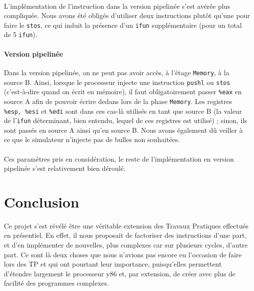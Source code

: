 \documentclass[12pt]{article}
\begin{document}
\paragraph{}L'implémentation de l'instruction dans la version pipelinée s'est avérée plus compliquée. Nous avons été obligés d'utiliser deux instructions plutôt qu'une pour faire le \verb+stos+, ce qui induit la présence d'un \verb+ifun+ supplémentaire (pour un total de 5 \verb+ifun+).

\paragraph{Version pipelinée}Dans la version pipelinée, on ne peut pas avoir accès, à l'étage \verb+Memory+, à la source B. Ainsi, lorsque le processeur injecte une instruction \verb+pushl+ ou \verb+stos+ (c'est-à-dire quand on écrit en mémoire), il faut obligatoirement passer \verb+%eax+ en source A afin de pouvoir écrire dedans lors de la phase \verb+Memory+. Les registres \verb+%esp, %esi+ et \verb+%edi+ sont dans ces cas-là utilisés en tant que source B (la valeur de l'\verb+ifun+ déterminant, bien entendu, lequel de ces registres est utilisé) ; sinon, ils sont passés en source A ainsi qu'en source B. Nous avons également dû veiller à ce que le simulateur n'injecte pas de bulles non souhaitées.

\paragraph{}Ces paramètres pris en considération, le reste de l'implémentation en version pipelinée s'est relativement bien déroulé.




\section*{Conclusion}
\paragraph{}Ce projet s'est révélé être une véritable extension des Travaux Pratiques effectués en présentiel. En effet, il nous proposait de factoriser des instructions d'une part, et d'en implémenter de nouvelles, plus complexes car sur plusieurs cycles, d'autre part. Ce sont là deux choses que nous n'avions pas encore eu l'occasion de faire lors des TP et qui ont pourtant leur importance, puisqu'elles permettent d'étendre largement le processeur y86 et, par extension, de créer avec plus de facilité des programmes complexes.
\end{document}
